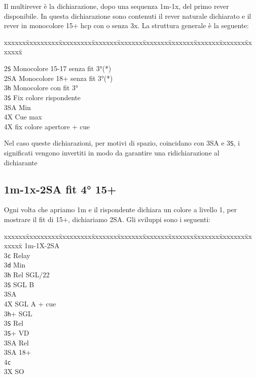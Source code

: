 \documentclass[a4paper,italian]{article}
\newcommand{\BS}{\small{\texttt{S}}}
\newcommand{\BC}{\small{\texttt{c}}}
\newcommand{\BD}{\small{\texttt{d}}}
\newcommand{\BH}{\small{\texttt{h}}}
\newenvironment{bidtable}
{\begin{tabbing}

    xxxxxx\=xxxxxxxxx\=xxxxxxxxx\=xxxxxxx\=xxxxxxx\=xxxxxxx\=xxxxxxx\=xxxxxxx\=xxxxxxx\=xxxxxxx\=\kill}
{\end{tabbing} }%
\newenvironment{attenzione}[1]
{\begin{tcolorbox}[colframe=red!80!white,title=#1]}
    {
\end{tcolorbox} }%
\begin{document}
Il multirever è la dichiarazione, dopo una sequenza 1m-1x, del primo rever disponibile. In questa dichiarazione sono contenuti il rever naturale dichiarato e il rever in monocolore 15+ hcp con o senza 3x. La struttura generale è la seguente:
\bigbreak
\begin{bidtable}

    2\BS \> Monocolore 15-17 senza fit 3°(*)\\
    2\small{SA} \> Monocolore 18+ senza fit 3°(*)\\
    3\BH \> Monocolore con fit 3°\+\\
    3\BS \> Fix colore rispondente\+\\
    3\small{SA} \> Min\\
    4X \> Cue max\-\\
    4X \> fix colore apertore + cue\-
\end{bidtable}
\bigbreak
\begin{attenzione}{ATTENZIONE(*)}
    Nel caso queste dichiarazioni, per motivi di spazio, coincidano con 3\small{SA} e 3\BS , i significati vengono invertiti in modo da garantire una ridichiarazione al dichiarante
\end{attenzione}
\newpage

\subsection{1m-1x-2SA fit 4° 15+}\label{2SAfit}

Ogni volta che apriamo 1m e il rispondente dichiara un colore a livello 1, per mostrare il fit di 15+, dichiariamo 2\small{SA}. Gli sviluppi sono i seguenti:
\bigbreak
\begin{bidtable}
    1m-1X-2\small{SA}\+\\
    3\BC \> Relay\+\\
    3\BD \> Min\+\\
    3\BH \> Rel SGL/22\+\\
    3\BS \> SGL B\\
    3\small{SA} \\
    4X \> SGL A + cue\-\-\\
    3\BH {}+ SGL\+\\
    3\BS \> Rel\-\\
    3\BS {}+ VD\+\\
    3\small{SA} \> Rel\-\\
    3\small{SA}  18+\\
    4\BC {}\-\\
    3X \> SO\-
\end{bidtable}
\end{document}
